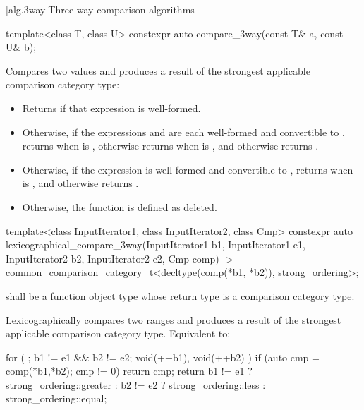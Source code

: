 [alg.3way]{Three-way comparison algorithms}

%
\begin{itemdecl}
template<class T, class U> constexpr auto compare_3way(const T& a, const U& b);
\end{itemdecl}

\begin{itemdescr}
\pnum
\effects
Compares two values and produces a result of the strongest applicable
comparison category type:
\begin{itemize}
\item
Returns  if that expression is well-formed.
\item
Otherwise, if the expressions  and 
are each well-formed and convertible to ,
returns 
when  is ,
otherwise returns 
when  is ,
and otherwise returns .
\item
Otherwise, if the expression 
is well-formed and convertible to ,
returns 
when  is ,
and otherwise returns .
\item
Otherwise, the function is defined as deleted.
\end{itemize}
\end{itemdescr}

%
\begin{itemdecl}
template<class InputIterator1, class InputIterator2, class Cmp>
  constexpr auto
    lexicographical_compare_3way(InputIterator1 b1, InputIterator1 e1,
                                 InputIterator2 b2, InputIterator2 e2,
                                 Cmp comp)
      -> common_comparison_category_t<decltype(comp(*b1, *b2)), strong_ordering>;
\end{itemdecl}

\begin{itemdescr}
\pnum
\requires
{} shall be a function object type
whose return type is a comparison category type.

\pnum
\effects
Lexicographically compares two ranges and
produces a result of the strongest applicable
comparison category type.
Equivalent to:
\begin{codeblock}
for ( ; b1 != e1 && b2 != e2; void(++b1), void(++b2) )
  if (auto cmp = comp(*b1,*b2); cmp != 0)
    return cmp;
return b1 != e1 ? strong_ordering::greater :
       b2 != e2 ? strong_ordering::less :
                  strong_ordering::equal;
\end{codeblock}
\end{itemdescr}

